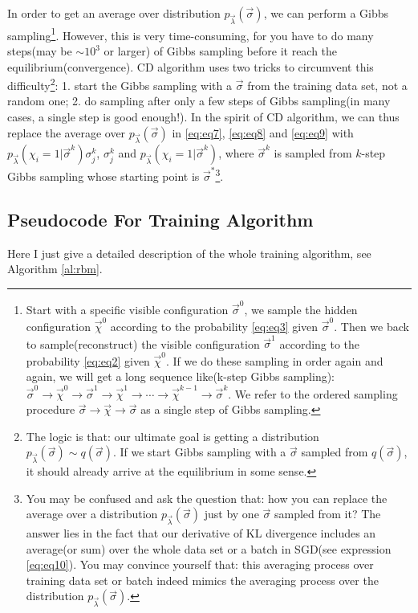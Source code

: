 \documentclass[letterpaper, 10pt]{article}
\begin{document}
In order to get an average over distribution $p_{\vec{\lambda}}(\vec{\sigma})$, we can perform a Gibbs sampling\footnote{Start with a specific visible configuration $\vec{\sigma}^0$, we sample the hidden configuration $\vec{\chi}^0$ according to the probability \ref{eq:eq3} given $\vec{\sigma}^0$. Then we back to sample(reconstruct) the visible configuration $\vec{\sigma}^1$ according to the probability \ref{eq:eq2} given $\vec{\chi}^0$. If we do these sampling in order again and again, we will get a long sequence like(k-step Gibbs sampling): $\vec{\sigma}^0 \rightarrow \vec{\chi}^0 \rightarrow \vec{\sigma}^1 \rightarrow \vec{\chi}^1 \rightarrow \cdots \rightarrow \vec{\chi}^{k-1} \rightarrow \vec{\sigma}^k$. We refer to the ordered sampling procedure $\vec{\sigma} \rightarrow \vec{\chi} \rightarrow \vec{\sigma}$ as a single step of Gibbs sampling.}. However, this is very time-consuming,  for you have to do many steps(may be $\sim 10^3$ or larger) of Gibbs sampling before it reach the equilibrium(convergence). CD algorithm uses two tricks to circumvent this difficulty\footnote{The logic is that: our ultimate goal is getting a distribution $p_{\vec{\lambda}}(\vec{\sigma}) \sim q(\vec{\sigma}).$ If we start Gibbs sampling with a $\vec{\sigma}$ sampled from $q(\vec{\sigma})$, it should already arrive at the equilibrium in some sense.}: 1. start the Gibbs sampling with a $\vec{\sigma}$ from the training data set, not a random one; 2. do sampling after only a few steps of Gibbs sampling(in many cases, a single step is good enough!). In the spirit of CD algorithm, we can thus replace the average over $p_{\vec{\lambda}}(\vec{\sigma})$ in \ref{eq:eq7}, \ref{eq:eq8} and \ref{eq:eq9} with $p_{\vec{\lambda}}(\chi_i=1 | \vec{\sigma}^k) \sigma_j^k$,  $\sigma_j^k$ and $p_{\vec{\lambda}}(\chi_i=1 | \vec{\sigma}^k)$, where $\vec{\sigma}^k$ is sampled from $k$-step Gibbs sampling whose starting point is $\vec{\sigma}^*$\footnote{You may be confused and ask the question that: how you can replace the average over a distribution $p_{\vec{\lambda}}(\vec{\sigma})$ just by one $\vec{\sigma}$ sampled from it? The answer lies in the fact that our derivative of KL divergence includes an average(or sum) over the whole data set or a batch in SGD(see expression \ref{eq:eq10}). You may convince yourself that: this averaging process over training data set or batch indeed mimics the averaging process over the distribution $p_{\vec{\lambda}}(\vec{\sigma})$.}.

\subsection{Pseudocode For Training Algorithm}
Here I just give a detailed description of the whole training algorithm, see Algorithm \ref{al:rbm}.
\end{document}

